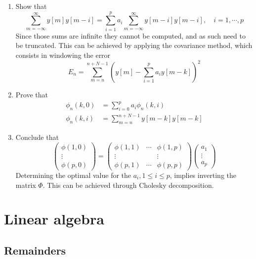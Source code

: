 \begin{enumerate}
	\item Show that
	\[ \sum_{m=-\infty}^{\infty} y[m]y[m-i]=\sum_{i=1}^p a_i\sum_{m=-\infty}^{\infty} y[m-i]y[m-i], \quad i=1,\cdots,p  \]
	Since those sums are infinite they cannot be computed, and as such need to be truncated.\cite{karris}
	This can be achieved by applying the covariance method, which consists in windowing the error
	\[ E_n=\sum_{m=n}^{n+N-1}\left(y[m]-\sum_{i=1}^p a_i y[m-k] \right)^2 \]
	\item Prove that
	\begin{align*}
	\phi_n(k,0)&=\sum_{i=0}^p a_i\phi_n(k,i) \\
	\phi_n(k,i)&=\sum_{m=n}^{n+N-1} y[m-k]y[m-k]
	\end{align*}
	\item Conclude that
	\[ \begin{pmatrix} \phi(1,0)\\ \vdots \\ \phi(p,0) \end{pmatrix}=\begin{pmatrix} \phi(1,1) & \cdots & \phi(1,p) \\ \vdots & & \vdots \\ \phi(p,1) & \cdots & \phi(p,p) \end{pmatrix}\begin{pmatrix} a_1 \\ \vdots \\ a_p \end{pmatrix} \]
	Determining the optimal value for the \(a_i, 1\leq i\leq p\), implies inverting the matrix $\Phi$.
	This can be achieved through Cholesky decomposition.\cite{gtm216,gtm135}
\end{enumerate}



\section{Linear algebra}

\subsection{Remainders}
